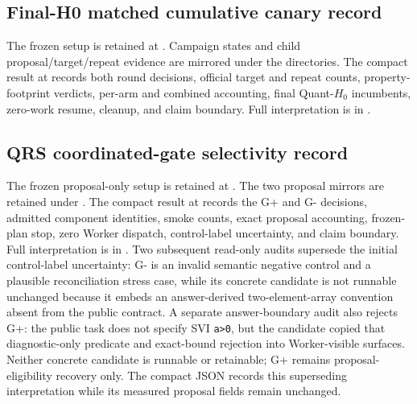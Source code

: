\subsection{Final-H0 matched cumulative canary record}

The frozen setup is retained at
. Campaign
states and child proposal/target/repeat evidence are mirrored under the
directories. The compact result at
 records
both round decisions, official target and repeat counts, property-footprint
verdicts, per-arm and combined accounting, final Quant-$H_0$ incumbents,
zero-work resume, cleanup, and claim boundary. Full interpretation is in
.

\subsection{QRS coordinated-gate selectivity record}

The frozen proposal-only setup is retained at
. The two
proposal mirrors are retained under
.
The compact result at
 records the
G+ and G- decisions, admitted component identities, smoke counts, exact
proposal accounting, frozen-plan stop, zero Worker dispatch, control-label
uncertainty, and claim boundary. Full interpretation is in
.
Two subsequent read-only audits supersede the initial control-label uncertainty:
G- is an invalid semantic negative control and a plausible reconciliation
stress case, while its concrete candidate is not runnable unchanged because it
embeds an answer-derived two-element-array convention absent from the public
contract. A separate answer-boundary audit also rejects G+: the public task does
not specify SVI \texttt{a>0}, but the candidate copied that diagnostic-only
predicate and exact-bound rejection into Worker-visible surfaces. Neither
concrete candidate is runnable or retainable; G+ remains proposal-eligibility
recovery only. The compact JSON records this superseding interpretation while
its measured proposal fields remain unchanged.

